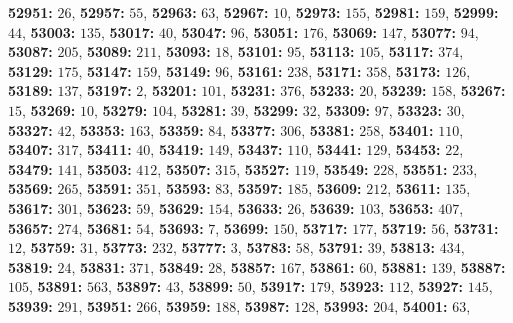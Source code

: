 \textsf{\bfseries 52951:} $26$, \textsf{\bfseries 52957:} $55$, \textsf{\bfseries 52963:} $63$, \textsf{\bfseries 52967:} $10$, \textsf{\bfseries 52973:} $155$, \textsf{\bfseries 52981:} $159$, \textsf{\bfseries 52999:} $44$, \textsf{\bfseries 53003:} $135$, \textsf{\bfseries 53017:} $40$, \textsf{\bfseries 53047:} $96$, \textsf{\bfseries 53051:} $176$, \textsf{\bfseries 53069:} $147$, \textsf{\bfseries 53077:} $94$, \textsf{\bfseries 53087:} $205$, \textsf{\bfseries 53089:} $211$, \textsf{\bfseries 53093:} $18$, \textsf{\bfseries 53101:} $95$, \textsf{\bfseries 53113:} $105$, \textsf{\bfseries 53117:} $374$, \textsf{\bfseries 53129:} $175$, \textsf{\bfseries 53147:} $159$, \textsf{\bfseries 53149:} $96$, \textsf{\bfseries 53161:} $238$, \textsf{\bfseries 53171:} $358$, \textsf{\bfseries 53173:} $126$, \textsf{\bfseries 53189:} $137$, \textsf{\bfseries 53197:} $2$, \textsf{\bfseries 53201:} $101$, \textsf{\bfseries 53231:} $376$, \textsf{\bfseries 53233:} $20$, \textsf{\bfseries 53239:} $158$, \textsf{\bfseries 53267:} $15$, \textsf{\bfseries 53269:} $10$, \textsf{\bfseries 53279:} $104$, \textsf{\bfseries 53281:} $39$, \textsf{\bfseries 53299:} $32$, \textsf{\bfseries 53309:} $97$, \textsf{\bfseries 53323:} $30$, \textsf{\bfseries 53327:} $42$, \textsf{\bfseries 53353:} $163$, \textsf{\bfseries 53359:} $84$, \textsf{\bfseries 53377:} $306$, \textsf{\bfseries 53381:} $258$, \textsf{\bfseries 53401:} $110$, \textsf{\bfseries 53407:} $317$, \textsf{\bfseries 53411:} $40$, \textsf{\bfseries 53419:} $149$, \textsf{\bfseries 53437:} $110$, \textsf{\bfseries 53441:} $129$, \textsf{\bfseries 53453:} $22$, \textsf{\bfseries 53479:} $141$, \textsf{\bfseries 53503:} $412$, \textsf{\bfseries 53507:} $315$, \textsf{\bfseries 53527:} $119$, \textsf{\bfseries 53549:} $228$, \textsf{\bfseries 53551:} $233$, \textsf{\bfseries 53569:} $265$, \textsf{\bfseries 53591:} $351$, \textsf{\bfseries 53593:} $83$, \textsf{\bfseries 53597:} $185$, \textsf{\bfseries 53609:} $212$, \textsf{\bfseries 53611:} $135$, \textsf{\bfseries 53617:} $301$, \textsf{\bfseries 53623:} $59$, \textsf{\bfseries 53629:} $154$, \textsf{\bfseries 53633:} $26$, \textsf{\bfseries 53639:} $103$, \textsf{\bfseries 53653:} $407$, \textsf{\bfseries 53657:} $274$, \textsf{\bfseries 53681:} $54$, \textsf{\bfseries 53693:} $7$, \textsf{\bfseries 53699:} $150$, \textsf{\bfseries 53717:} $177$, \textsf{\bfseries 53719:} $56$, \textsf{\bfseries 53731:} $12$, \textsf{\bfseries 53759:} $31$, \textsf{\bfseries 53773:} $232$, \textsf{\bfseries 53777:} $3$, \textsf{\bfseries 53783:} $58$, \textsf{\bfseries 53791:} $39$, \textsf{\bfseries 53813:} $434$, \textsf{\bfseries 53819:} $24$, \textsf{\bfseries 53831:} $371$, \textsf{\bfseries 53849:} $28$, \textsf{\bfseries 53857:} $167$, \textsf{\bfseries 53861:} $60$, \textsf{\bfseries 53881:} $139$, \textsf{\bfseries 53887:} $105$, \textsf{\bfseries 53891:} $563$, \textsf{\bfseries 53897:} $43$, \textsf{\bfseries 53899:} $50$, \textsf{\bfseries 53917:} $179$, \textsf{\bfseries 53923:} $112$, \textsf{\bfseries 53927:} $145$, \textsf{\bfseries 53939:} $291$, \textsf{\bfseries 53951:} $266$, \textsf{\bfseries 53959:} $188$, \textsf{\bfseries 53987:} $128$, \textsf{\bfseries 53993:} $204$, \textsf{\bfseries 54001:} $63$, 
